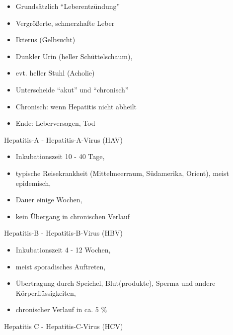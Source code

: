 \documentclass{article}
\begin{document}
\begin{itemize}
\item Grunds\"atzlich
{\textquotedblleft}Leberentz\"undung{\textquotedblright}

\item Vergr\"o{\ss}erte, schmerzhafte Leber 

\item Ikterus (Gelbsucht) 

\item Dunkler Urin (heller Sch\"uttelschaum),

\item evt. heller Stuhl (Acholie)

\item Unterscheide {\textquotedblleft}akut{\textquotedblright} und
{\textquotedblleft}chronisch{\textquotedblright}

\end{itemize}
\begin{itemize}
\item Chronisch: wenn Hepatitis nicht abheilt

\end{itemize}
\begin{itemize}
\item Ende: Leberversagen, Tod

\end{itemize}
Hepatitis-A - Hepatitis-A-Virus (HAV)

\begin{itemize}
\item Inkubationszeit 10 - 40 Tage, 

\item typische Reisekrankheit (Mittelmeerraum, S\"udamerika, Orient),
meist epidemisch, 

\item Dauer einige Wochen, 

\item kein \"Ubergang in chronischen Verlauf

\end{itemize}
Hepatitis-B - Hepatitis-B-Virus (HBV)

\begin{itemize}
\item Inkubationszeit 4 - 12 Wochen, 

\item meist sporadisches Auftreten, 

\item \"Ubertragung durch Speichel, Blut(produkte), Sperma und andere
K\"orperfl\"ussigkeiten, 

\item chronischer Verlauf in ca. 5 \%

\end{itemize}
Hepatitis C - Hepatitis-C-Virus (HCV)
\end{document}
